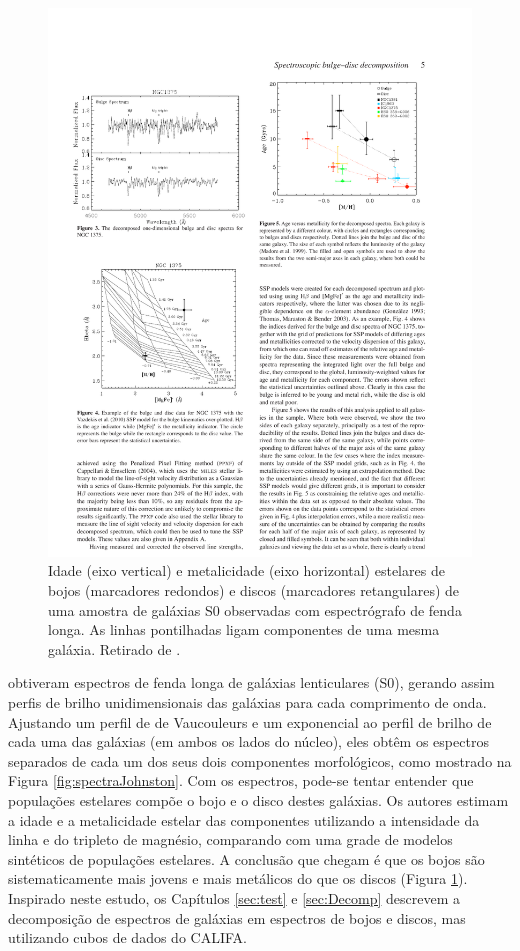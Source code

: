 \begin{figure}
	\includegraphics{figuras/johnston-pop}
	\caption[Idade e metalicidade de bojos e discos de galáxias S0] {Idade (eixo
	vertical) e metalicidade (eixo horizontal) estelares de bojos (marcadores
	redondos) e discos (marcadores retangulares) de uma amostra de galáxias S0
	observadas com espectrógrafo de fenda longa. As linhas pontilhadas ligam
	componentes de uma mesma galáxia. Retirado de \citet{Johnston2012}.}
	\label{fig:populationJohnston}
\end{figure}

\citet{Johnston2012} obtiveram espectros de fenda longa de galáxias lenticulares
(S0), gerando assim perfis de brilho unidimensionais das galáxias para cada
comprimento de onda. Ajustando um perfil de de Vaucouleurs e um exponencial ao
perfil de brilho de cada uma das galáxias (em ambos os lados do núcleo), eles
obtêm os espectros separados de cada um dos seus dois componentes morfológicos,
como mostrado na Figura \ref{fig:spectraJohnston}. Com os espectros, pode-se
tentar entender que populações estelares compõe o bojo e o disco destes
galáxias. Os autores estimam a idade e a metalicidade estelar das componentes
utilizando a intensidade da linha \Hbeta e do tripleto de magnésio, comparando
com uma grade de modelos sintéticos de populações estelares. A conclusão que
chegam é que os bojos são sistematicamente mais jovens e mais metálicos do que
os discos (Figura \ref{fig:populationJohnston}). Inspirado neste estudo, os
Capítulos \ref{sec:test} e \ref{sec:Decomp} descrevem a decomposição de
espectros de galáxias em espectros de bojos e discos, mas utilizando cubos de
dados do CALIFA.

